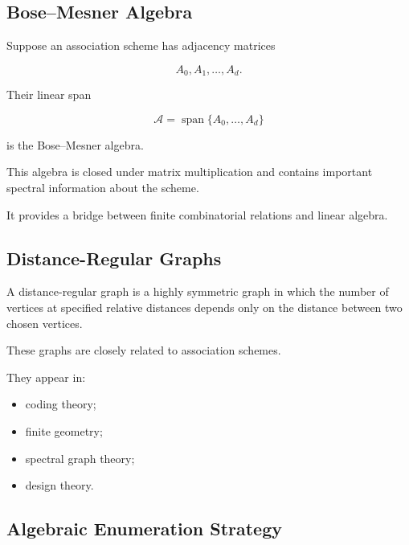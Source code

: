 \subsection{Bose--Mesner Algebra}
\label{subsec:bose-mesner-algebra}

Suppose an association scheme has adjacency matrices

\[
A_0,A_1,\ldots,A_d.
\]

Their linear span

\[
\boxed{
\mathcal{A}
=
\operatorname{span}
\{A_0,\ldots,A_d\}
}
\]

is the Bose--Mesner algebra.

This algebra is closed under matrix multiplication and contains
important spectral information about the scheme.

It provides a bridge between finite combinatorial relations and linear
algebra.

\subsection{Distance-Regular Graphs}
\label{subsec:distance-regular-graphs-preview}

A distance-regular graph is a highly symmetric graph in which the number
of vertices at specified relative distances depends only on the
distance between two chosen vertices.

These graphs are closely related to association schemes.

They appear in:

\begin{itemize}
    \item coding theory;
    \item finite geometry;
    \item spectral graph theory;
    \item design theory.
\end{itemize}

\subsection{Algebraic Enumeration Strategy}
\label{subsec:algebraic-enumeration-strategy}

